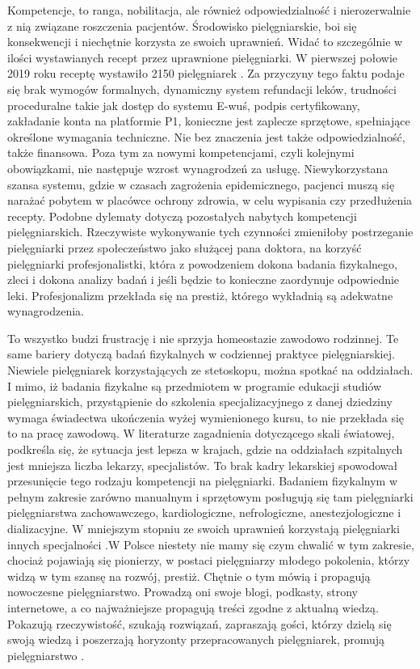 \documentclass[a4paper,12pt,twoside,openany]{report}
\begin{document}
Kompetencje, to ranga, nobilitacja, ale również odpowiedzialność i nierozerwalnie z nią związane roszczenia pacjentów. Środowisko pielęgniarskie, boi się konsekwencji i niechętnie korzysta ze swoich uprawnień. Widać to szczególnie w ilości wystawianych recept przez uprawnione pielęgniarki. W pierwszej połowie 2019 roku receptę wystawiło 2150 pielęgniarek \cite{model}. Za przyczyny tego faktu podaje się brak wymogów formalnych, dynamiczny system refundacji leków, trudności proceduralne takie jak dostęp do systemu E-wuś, podpis certyfikowany, zakładanie konta na platformie P1, konieczne jest zaplecze sprzętowe, spełniające określone wymagania techniczne.  Nie bez znaczenia jest także odpowiedzialność, także finansowa. Poza tym za nowymi kompetencjami, czyli kolejnymi obowiązkami, nie następuje wzrost wynagrodzeń za usługę. Niewykorzystana szansa systemu, gdzie w czasach zagrożenia epidemicznego, pacjenci muszą się narażać pobytem w placówce ochrony zdrowia, w celu wypisania czy przedłużenia recepty. Podobne dylematy dotyczą pozostałych nabytych kompetencji pielęgniarskich. Rzeczywiste wykonywanie tych czynności zmieniłoby postrzeganie pielęgniarki przez społeczeństwo jako służącej pana doktora, na korzyść pielęgniarki profesjonalistki, która z powodzeniem dokona badania fizykalnego, zleci i dokona analizy badań i jeśli będzie to konieczne zaordynuje odpowiednie leki. Profesjonalizm przekłada się na prestiż, którego wykładnią są adekwatne wynagrodzenia. 

To wszystko budzi frustrację i nie sprzyja homeostazie zawodowo rodzinnej.  Te same bariery dotyczą badań fizykalnych w codziennej praktyce pielęgniarskiej. Niewiele  pielęgniarek  korzystających ze stetoskopu,  można spotkać na oddziałach. I mimo, iż badania fizykalne są przedmiotem w programie edukacji studiów pielęgniarskich, przystąpienie do szkolenia specjalizacyjnego z danej dziedziny wymaga świadectwa ukończenia wyżej wymienionego kursu, to nie przekłada się to na pracę zawodową. W literaturze zagadnienia dotyczącego skali światowej, podkreśla się, że sytuacja jest lepsza w krajach, gdzie na oddziałach szpitalnych jest mniejsza liczba lekarzy, specjalistów. To brak kadry lekarskiej spowodował przesunięcie tego rodzaju kompetencji na pielęgniarki. Badaniem fizykalnym w pełnym zakresie zarówno manualnym i sprzętowym posługują się tam pielęgniarki pielęgniarstwa zachowawczego, kardiologiczne, nefrologiczne, anestezjologiczne i dializacyjne. W mniejszym stopniu ze swoich uprawnień korzystają pielęgniarki innych specjalności \cite{badania}.W Polsce niestety nie mamy się czym chwalić w tym zakresie, chociaż pojawiają się pionierzy, w postaci pielęgniarzy młodego pokolenia, którzy widzą w tym szansę na rozwój, prestiż. Chętnie o tym mówią i propagują nowoczesne pielęgniarstwo. Prowadzą oni swoje blogi, podkasty, strony internetowe, a co najważniejsze propagują treści zgodne z aktualną wiedzą.  Pokazują rzeczywistość, szukają rozwiązań, zapraszają gości, którzy dzielą się swoją wiedzą i poszerzają horyzonty przepracowanych pielęgniarek, promują pielęgniarstwo \cite{spoty}.
\end{document}
